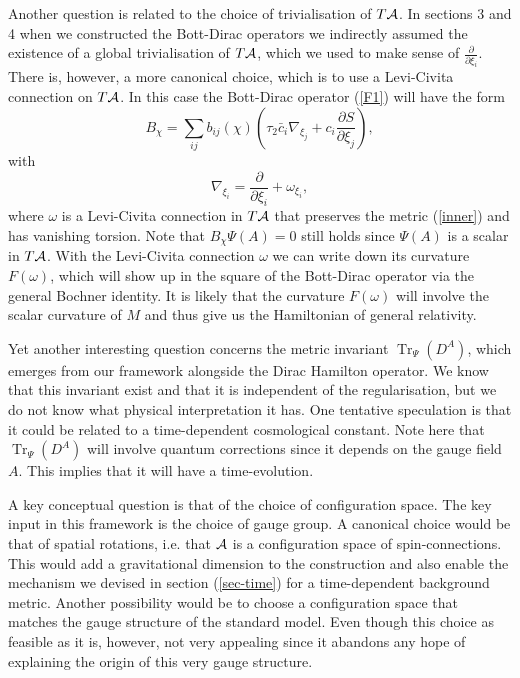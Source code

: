 \documentclass[12pt]{article}
\def\oo{\omega}
\def\ca{{\cal A}}
\newcommand{\pa}{\partial}
\newcommand{\Tr}{\operatorname{Tr}}
\begin{document}
Another question is related to the choice of trivialisation of $T\ca$. In sections 3 and 4 when we constructed the Bott-Dirac operators we indirectly assumed the existence of a global trivialisation of $T\ca$, which we used to make sense of $\frac{\pa}{\pa\xi_i}$. There is, however, a more canonical choice, which is to use a Levi-Civita connection on $T\ca$.
In this case the Bott-Dirac operator (\ref{F1}) will have the form
$$
B_\chi  =\sum_{ij} b_{ij}(\chi) \left(\tau_2\bar{c}_{i} \nabla_{\xi_j} + {c}_{i} \frac{\pa S}{\pa\xi_j} \right) ,
$$
with
$$
\nabla_{\xi_i}= \frac{\pa}{\pa\xi_i}+ \oo_{\xi_i},
$$
where $\oo$ is a Levi-Civita connection in $T\ca$ that preserves the metric (\ref{inner}) and has vanishing torsion. Note that $B_\chi \Psi (A)=0$ still holds since $\Psi{(A)}$ is a scalar in $T\ca$. 
With the Levi-Civita connection $\oo$ we can write down its curvature 
$
F(\oo)
$, which will show up in the square of the Bott-Dirac operator via the general Bochner identity. It is likely that the curvature $F(\oo)$ will involve the scalar curvature of $M$ and thus give us the Hamiltonian of general relativity. 






Yet another interesting question concerns the metric invariant $\Tr_\Psi (D^A)$, which emerges from our framework alongside the Dirac Hamilton operator. We know that this invariant exist and that it is independent of the regularisation, but we do not know what physical interpretation it has. One tentative speculation is that it could be related to a time-dependent cosmological constant.  Note here that $\Tr_\Psi (D^A)$ will involve quantum corrections since it depends on the gauge field $A$. This implies that it will have a time-evolution.


A key conceptual question is that of the choice of configuration space. The key input in this framework is the choice of gauge group. A canonical choice would be that of spatial rotations, i.e. that $\ca$ is a configuration space of spin-connections. This would add a gravitational dimension to the construction and also enable the mechanism we devised in section (\ref{sec-time}) for a time-dependent background metric. Another possibility would be to choose a configuration space that matches the gauge structure of the standard model. Even though this choice as feasible as it is, however, not very appealing since it abandons any hope of explaining the origin of this very gauge structure. 
\end{document}
